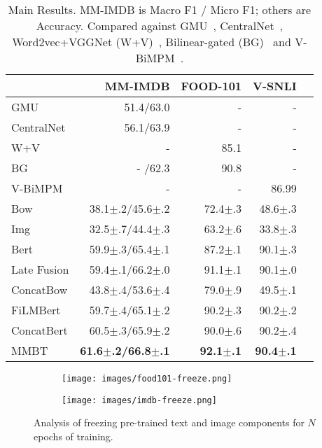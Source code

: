 \documentclass[11pt,a4paper]{article}
\begin{document}
\begin{table}[t]
    \centering\small
  \begin{tabular}{lrrrr}
    \toprule
    & MM-IMDB & FOOD-101 & V-SNLI \\\midrule
GMU & 51.4/63.0 & - & - \\
  	CentralNet & 56.1/63.9 & - & -\\
  	W+V & - & 85.1 & -\\
  	BG & - /62.3 & 90.8 & -\\
  	V-BiMPM & - & - & 86.99\\\midrule
  	Bow & 38.1$\pm$.2/45.6$\pm$.2 & 72.4$\pm$.3 & 48.6$\pm$.3\\
  	Img & 32.5$\pm$.7/44.4$\pm$.3 & 63.2$\pm$.6 & 33.8$\pm$.3\\
  	Bert & 59.9$\pm$.3/65.4$\pm$.1 & 87.2$\pm$.1 & 90.1$\pm$.3\\\midrule
  	Late Fusion & 59.4$\pm$.1/66.2$\pm$.0 & 91.1$\pm$.1 & 90.1$\pm$.0\\
  	ConcatBow & 43.8$\pm$.4/53.6$\pm$.4 & 79.0$\pm$.9 & 49.5$\pm$.1\\
  	FiLMBert & 59.7$\pm$.4/65.1$\pm$.2 & 90.2$\pm$.3 & 90.2$\pm$.2\\
  	ConcatBert & 60.5$\pm$.3/65.9$\pm$.2 & 90.0$\pm$.6 & 90.2$\pm$.4\\
  	MMBT & \textbf{61.6$\pm$.2/66.8$\pm$.1} & \textbf{92.1$\pm$.1} & \textbf{90.4$\pm$.1}\\
  	\bottomrule
  \end{tabular}
    \caption{Main Results. MM-IMDB is Macro F1 / Micro F1; others are Accuracy. Compared against GMU~\cite{Arevalo:2017mmimdb}, CentralNet~\cite{Vielzeuf:2018eccv}, Word2vec+VGGNet (W+V)~\cite{Wang:2015food101}, Bilinear-gated (BG)~\cite{Kiela:2018aaai} and V-BiMPM~\cite{Vu:2018vsnli}.}
    \label{tab:main}
\end{table}

\begin{figure*}[t]
    \centering
\begin{subfigure}{0.4\textwidth}
  \centering
  \texttt{[image: images/food101-freeze.png]}
\end{subfigure}\begin{subfigure}{0.4\textwidth}
  \centering
  \texttt{[image: images/imdb-freeze.png]}
\end{subfigure}
    \caption{\label{fig:freezing}Analysis of freezing pre-trained text and image components for $N$ epochs of training.}
\end{figure*}
\end{document}
